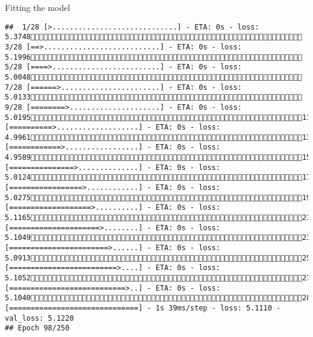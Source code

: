 \documentclass[
  ignorenonframetext,
]{beamer}
\begin{document}
\begin{frame}[fragile]{Fitting the model}
\begin{verbatim}
##  1/28 [>.............................] - ETA: 0s - loss: 5.3748 3/28 [==>...........................] - ETA: 0s - loss: 5.1996 5/28 [====>.........................] - ETA: 0s - loss: 5.0048 7/28 [======>.......................] - ETA: 0s - loss: 5.0133 9/28 [========>.....................] - ETA: 0s - loss: 5.019511/28 [==========>...................] - ETA: 0s - loss: 4.996113/28 [============>.................] - ETA: 0s - loss: 4.958915/28 [===============>..............] - ETA: 0s - loss: 5.012417/28 [=================>............] - ETA: 0s - loss: 5.027519/28 [===================>..........] - ETA: 0s - loss: 5.116521/28 [=====================>........] - ETA: 0s - loss: 5.104923/28 [=======================>......] - ETA: 0s - loss: 5.091325/28 [=========================>....] - ETA: 0s - loss: 5.105227/28 [===========================>..] - ETA: 0s - loss: 5.104028/28 [==============================] - 1s 39ms/step - loss: 5.1110 - val_loss: 5.1220
## Epoch 98/250

\end{verbatim}
\end{frame}
\end{document}
